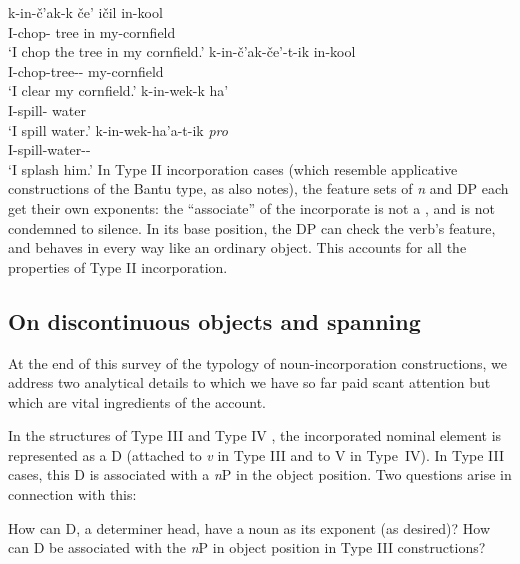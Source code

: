\documentclass[output=paper]{langsci/langscibook}
\begin{document}
\begin{refcontext}
\ea\label{18}
    \ea \gll k-in-\v{c}'ak-k \v{c}e' i\v{c}il in-kool\\
    \Incmpl{}\normalfont{-}I-chop-\Ipfv{} tree in my-cornfield\\
    \glt \enquote*{I chop the tree in my cornfield.}
    \ex \gll k-in-\v{c}'ak-\v{c}e'-t-ik in-kool\\
    \Incmpl{}\normalfont{-}I-chop-tree-\Tr-\Ipfv{} my-cornfield\\
    \glt \enquote*{I clear my cornfield.}
    \z
\ex\label{19}
    \ea \gll k-in-wek-k ha'\\
    \Incmpl{}\normalfont{-}I-spill-\Ipfv{} water\\
    \glt \enquote*{I spill water.}
    \ex \gll k-in-wek-ha'a-t-ik \emph{pro}\\
    \Incmpl{}\normalfont{-}I-spill-water-\Tr-\Ipfv{}\\
    \glt \enquote*{I splash him.}
    \z
\z
In Type II incorporation cases (which resemble applicative constructions of the
Bantu type, as \citet{rosen89} also notes), the feature sets of \emph{n} and DP
each get their own exponents: the \enquote{associate} of the incorporate is
not a , and is not condemned to silence. In its base position,
the DP can check the verb's  feature, and behaves in every way
like an ordinary object. This accounts for all the properties of Type II
incorporation.

\subsection{On discontinuous objects and spanning}
\label{sec:16.2.4}
At the end of this survey of the typology of noun-incorporation constructions, we address two analytical
details to which we have so far paid scant attention but which are vital ingredients of the account.


In the structures of Type III and Type IV , the incorporated nominal
element is represented as a D (attached to \emph{v} in Type III and to V in Type~IV). In Type III cases, this
D is associated with a \emph{n}P in the object position. Two questions arise in connection with this:

\ea 
\ea How can D, a determiner head, have a noun as its exponent (as desired)?\label{ex:19:Q1}
\ex How can D be associated with the \emph{n}P in object position in Type III constructions?\label{ex:19:Q2}
\z\z


\end{refcontext}
\end{document}

